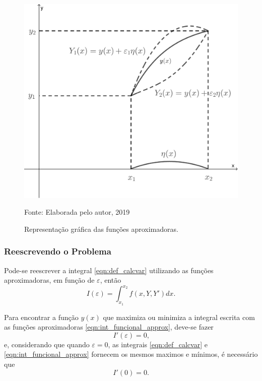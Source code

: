 \documentclass{beamer}
\begin{document}
{
\usebackgroundtemplate{}
	\begin{frame}
		\begin{figure}
			\caption{Representação gráfica das funções aproximadoras.}
			\begin{center}
				\includegraphics[scale=0.25]{figura_001}\par
				{\small Fonte: Elaborada pelo autor, 2019}
			\end{center}
			\label{fig:func_approx}
		\end{figure}
	\end{frame}
}
	
\begin{frame}
	\frametitle{Reescrevendo o Problema}
	Pode-se reescrever a integral \eqref{eqn:def_calcvar} utilizando as funções aproximadoras, em função de $\varepsilon$, então
	\begin{equation}
		\label{eqn:int_funcional_approx}
		I(\varepsilon)=\int_{x_1}^{x_2}f(x, Y, Y')dx\text{.}
	\end{equation}
	
	Para encontrar a função $y(x)$ que maximiza ou minimiza a integral escrita com as funções aproximadoras \eqref{eqn:int_funcional_approx}, deve-se fazer
	$$I'(\varepsilon)=0\text{,}$$
	e, considerando que quando $\varepsilon=0$, as integrais \eqref{eqn:def_calcvar} e \eqref{eqn:int_funcional_approx} fornecem os mesmos maximos e mínimos, é necessário que
	$$I'(0)=0\text{.}$$
\end{frame}
\end{document}
